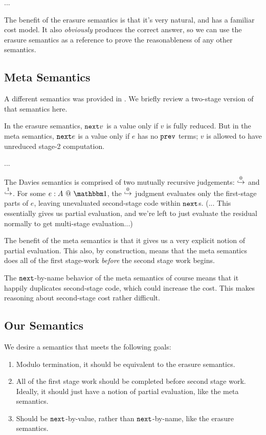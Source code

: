 \documentclass{sigplanconf}
\begin{document}
...

The benefit of the erasure semantics is that it's very natural, and has a familiar cost model.  It also {\em obviously} produces the correct answer, so we can use the erasure semantics as a reference to prove the reasonableness of any other semantics.

\subsection{Meta Semantics}

A different semantics was provided in \cite{davies96}.  We briefly review a two-stage version of that semantics here.

In the erasure semantics, ${\tt next} v$ is a value only if $v$ is fully reduced.  But in the meta semantics, ${\tt next} e$ is a value only if $e$ has no ${\tt prev}$ terms; $v$ is allowed to have unreduced stage-2 computation. 

...

The Davies semantics is comprised of two mutually recursive judgements: $\overset 0 \hookrightarrow$ and $\overset 1 \hookrightarrow$.  For some $\colone e A$, the $\overset 0 \hookrightarrow$ judgment evaluates only the first-stage parts of $e$, leaving unevaluated second-stage code within ${\tt next}$s.  (... This essentially gives us partial evaluation, and we're left to just evaluate the residual normally to get multi-stage evaluation...) 

The benefit of the meta semantics is that it gives us a very explicit notion of partial evaluation.  This also, by construction, means that the meta semantics does all of the first stage-work {\em before} the second stage work begins. 

The ${\tt next}$-by-name behavior of the meta semantics of course means that it happily duplicates second-stage code, which could increase the cost.  This makes reasoning about second-stage cost rather difficult.

\subsection{Our Semantics}

We desire a semantics that meets the following goals:

\begin{enumerate}
\item Modulo termination, it should be equivalent to the erasure semantics.
\item All of the first stage work should be completed before second stage work.  Ideally, it should just have a notion of partial evaluation, like the meta semantics.
\item Should be ${\tt next}$-by-value, rather than ${\tt next}$-by-name, like the erasure semantics.  
\end{enumerate}
\end{document}
